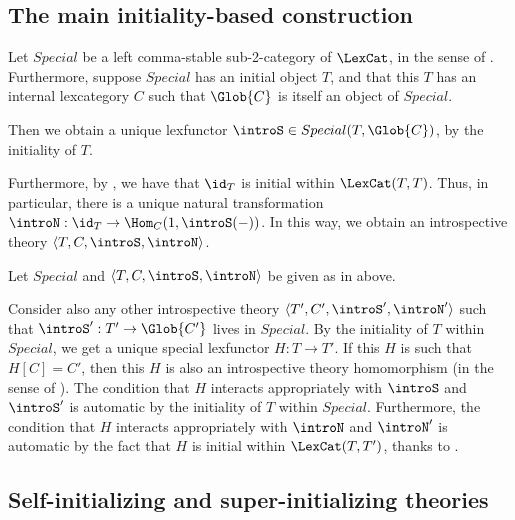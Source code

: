 \subsection{The main initiality-based construction}
\begin{construction}\label{SpecialInitialIntrosp}
Let $Special$ be a left comma-stable sub-2-category of $\LexCat$, in the sense of . Furthermore, suppose $Special$ has an initial object $T$, and that this $T$ has an internal lexcategory $C$ such that $\Glob{C}$ is itself an object of $Special$.

Then we obtain a unique lexfunctor $\introS \in Special(T, \Glob{C})$, by the initiality of $T$.

Furthermore, by , we have that $\id_T$ is initial within $\LexCat(T, T)$. Thus, in particular, there is a unique natural transformation $\introN : \id_T \to \Hom_C(1, \introS(-))$. In this way, we obtain an introspective theory $\langle T, C, \introS, \introN \rangle$.
\end{construction}

\begin{theorem}
Let $Special$ and $\langle T, C, \introS, \introN \rangle$ be given as in  above.

Consider also any other introspective theory $\langle T', C', \introS', \introN' \rangle$ such that $\introS' : T' \to \Glob{C'}$ lives in $Special$. By the initiality of $T$ within $Special$, we get a unique special lexfunctor $H : T \to T'$. If this $H$ is such that $H[C] = C'$, then this $H$ is also an introspective theory homomorphism (in the sense of ). The condition that $H$ interacts appropriately with $\introS$ and $\introS'$ is automatic by the initiality of $T$ within $Special$. Furthermore, the condition that $H$ interacts appropriately with $\introN$ and $\introN'$ is automatic by the fact that $H$ is initial within $\LexCat(T, T')$, thanks to .
\end{theorem}

\subsection{Self-initializing and super-initializing theories}
